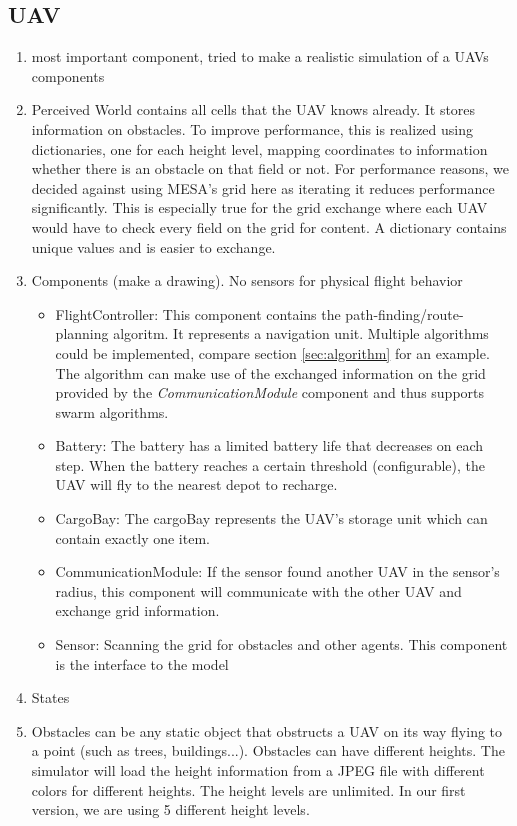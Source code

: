 \subsection{UAV}
\begin{enumerate}
	\item most important component, tried to make a realistic simulation of a UAVs components
	\item Perceived World contains all cells that the UAV knows already. It stores information on obstacles. To improve performance, this is realized using dictionaries, one for each height level, mapping coordinates to information whether there is an obstacle on that field or not. For performance reasons, we decided against using MESA's grid here as iterating it reduces performance significantly. This is especially true for the grid exchange where each UAV  would have to check every field on the grid for content.  A dictionary contains unique values and is easier to exchange.
	\item Components (make a drawing). No sensors for physical flight behavior
	\begin{itemize}
		\item FlightController: This component contains the path-finding/route-planning algoritm. It represents a navigation unit. Multiple algorithms could be implemented, compare section \ref{sec:algorithm} for an example. The algorithm can make use of the exchanged information on the grid provided by the \textit{CommunicationModule} component and thus supports swarm algorithms.
		\item Battery: The battery has a limited battery life that decreases on each step. When the battery reaches a certain threshold (configurable), the UAV will fly to the nearest depot to recharge.
		\item CargoBay: The cargoBay represents the UAV's storage unit which can contain exactly one item.
		\item CommunicationModule: If the sensor found another UAV in the sensor's radius, this component will communicate with the other UAV and exchange grid information.
		\item Sensor: Scanning the grid for obstacles and other agents. This component is the interface to the model
	\end{itemize}
	\item States
	\item Obstacles can be any static object that obstructs a UAV on its way flying to a point (such as trees, buildings...). Obstacles can have different heights. The simulator will load the height information from a JPEG file with different colors for different heights. The height levels are unlimited. In our first version, we are using 5 different height levels.
\end{enumerate}


